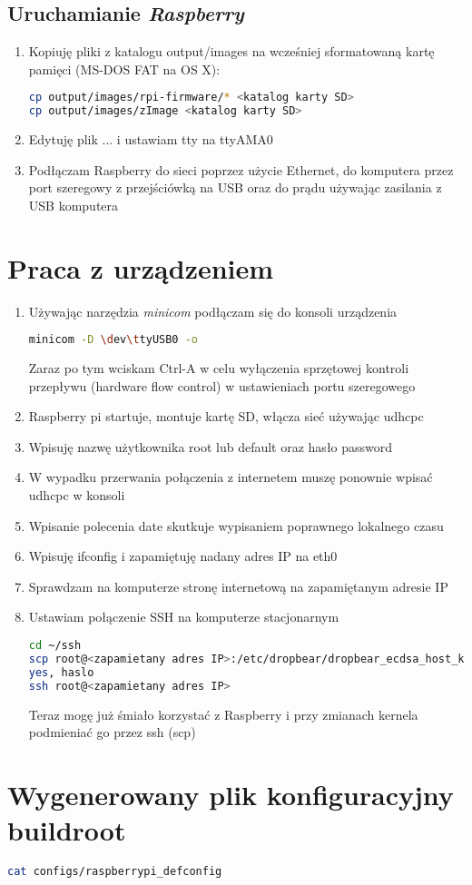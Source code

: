 \subsection{Uruchamianie \emph{Raspberry}}

\begin{enumerate}
\item Kopiuję pliki z katalogu output/images na wcześniej sformatowaną kartę pamięci (MS-DOS FAT na OS X):	\begin{lstlisting}[language=bash]
cp output/images/rpi-firmware/* <katalog karty SD>
cp output/images/zImage <katalog karty SD>
\end{lstlisting}	

\item Edytuję plik ... i ustawiam tty na ttyAMA0
\item Podłączam Raspberry do sieci poprzez użycie Ethernet, do komputera przez port szeregowy z przejściówką na USB oraz do prądu używając zasilania z USB komputera

\end{enumerate}
\section{Praca z urządzeniem}
\begin{enumerate}
\item Używając narzędzia \emph{minicom} podłączam się do konsoli urządzenia
\begin{lstlisting}[language=bash]
minicom -D \dev\ttyUSB0 -o
\end{lstlisting}	
Zaraz po tym wciskam Ctrl-A w celu wyłączenia sprzętowej kontroli przepływu (hardware flow control) w ustawieniach portu szeregowego
\item Raspberry pi startuje, montuje kartę SD, włącza sieć używając udhcpc
\item Wpisuję nazwę użytkownika root lub default oraz hasło password
\item W wypadku przerwania połączenia z internetem muszę ponownie wpisać udhcpc w konsoli
\item Wpisanie polecenia date skutkuje wypisaniem poprawnego lokalnego czasu
\item Wpisuję ifconfig i zapamiętuję nadany adres IP na eth0
\item Sprawdzam na komputerze stronę internetową na zapamiętanym adresie IP
\item Ustawiam połączenie SSH na komputerze stacjonarnym
\begin{lstlisting}[language=bash]
cd ~/ssh
scp root@<zapamietany adres IP>:/etc/dropbear/dropbear_ecdsa_host_key ./
yes, haslo
ssh root@<zapamietany adres IP>
\end{lstlisting}
Teraz mogę już śmiało korzystać z Raspberry i przy zmianach kernela podmieniać go przez ssh (scp)
\end{enumerate}

\section{Wygenerowany plik konfiguracyjny buildroot}
\begin{lstlisting}[language=bash]
cat configs/raspberrypi_defconfig 

\end{lstlisting}	


